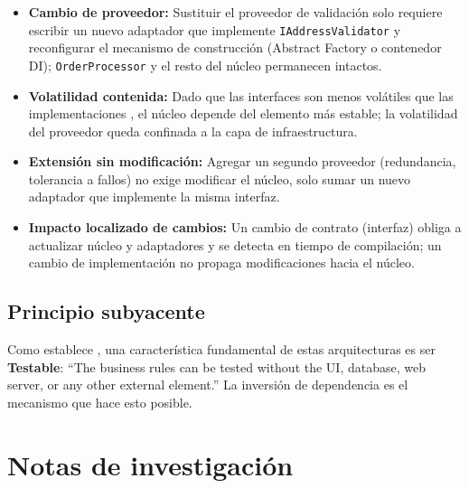 \begin{itemize}
    \item \textbf{Cambio de proveedor:} Sustituir el proveedor de validación solo requiere escribir un nuevo adaptador que implemente \texttt{IAddressValidator} y reconfigurar el mecanismo de construcción (Abstract Factory o contenedor DI); \texttt{OrderProcessor} y el resto del núcleo permanecen intactos.
    \item \textbf{Volatilidad contenida:} Dado que las interfaces son menos volátiles que las implementaciones , el núcleo depende del elemento más estable; la volatilidad del proveedor queda confinada a la capa de infraestructura.
    \item \textbf{Extensión sin modificación:} Agregar un segundo proveedor (redundancia, tolerancia a fallos) no exige modificar el núcleo, solo sumar un nuevo adaptador que implemente la misma interfaz.
    \item \textbf{Impacto localizado de cambios:} Un cambio de contrato (interfaz) obliga a actualizar núcleo y adaptadores y se detecta en tiempo de compilación; un cambio de implementación no propaga modificaciones hacia el núcleo.
\end{itemize}

\subsection*{Principio subyacente}

Como establece \citet[p.~202]{martin2017}, una característica fundamental de estas arquitecturas es ser \textbf{Testable}: \enquote{The business rules can be tested without the UI, database, web server, or any other external element.} La inversión de dependencia es el mecanismo que hace esto posible.



\section*{Notas de investigación}

